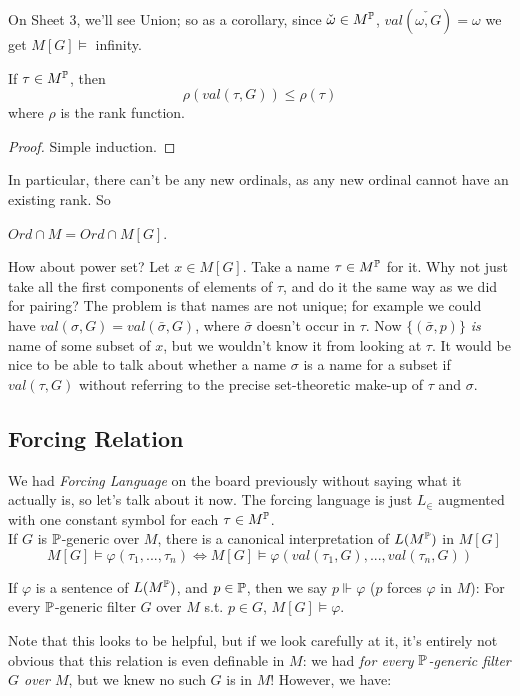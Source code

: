 \documentclass[a4paper]{article}
\begin{document}
On Sheet 3, we'll see Union; so as a corollary, since $\check{\omega} \in M^\P$, $val(\check{\omega,G}) = \omega$ we get $M[G] \vDash$ infinity.

\begin{lemma}
If $\tau \in M^\P$, then 
\[
\rho(val(\tau,G)) \leq \rho(\tau)
\]
where $\rho$ is the rank function.
\begin{proof}
Simple induction.
\end{proof}
\end{lemma}
In particular, there can't be any new ordinals, as any new ordinal cannot have an existing rank. So
\begin{coro}
$Ord \cap M = Ord \cap M[G]$.
\end{coro}

How about power set? Let $x \in M[G]$. Take a name $\tau \in M^\P$ for it. Why not just take all the first components of elements of $\tau$, and do it the same way as we did for pairing? The problem is that names are not unique; for example we could have $val(\sigma,G)=val(\bar{\sigma},G)$, where $\bar{\sigma}$ doesn't occur in $\tau$. Now $\{(\bar{\sigma},p)\}$ \emph{is} name of some subset of $x$, but we wouldn't know it from looking at $\tau$. It would be nice to be able to talk about whether a name $\sigma$ is a name for a subset if $val(\tau,G)$ without referring to the precise set-theoretic make-up of $\tau$ and $\sigma$.

\subsection{Forcing Relation}

We had \emph{Forcing Language} on the board previously without saying what it actually is, so let's talk about it now. The forcing language is just $L_\in$ augmented with one constant symbol for each $\tau \in M^\P$.\\
If $G$ is $\P$-generic over $M$, there is a canonical interpretation of $L(M^\P)$ in $M[G]$
\[
M[G] \vDash \varphi(\tau_1,...,\tau_n) \iff M[G] \vDash \varphi(val(\tau_1,G),...,val(\tau_n,G))
\]

If $\varphi$ is a sentence of $L(M^\P)$, and $p \in \P$, then we say $p\Vdash \varphi$ ($p$ forces $\varphi$ in $M$): For every $\P$-generic filter $G$ over $M$ s.t. $p \in G$, $M[G] \vDash \varphi$.

Note that this looks to be helpful, but if we look carefully at it, it's entirely not obvious that this relation is even definable in $M$: we had \emph{for every $\P$-generic filter $G$ over $M$}, but we knew no such $G$ is in $M$! However, we have:
\end{document}
